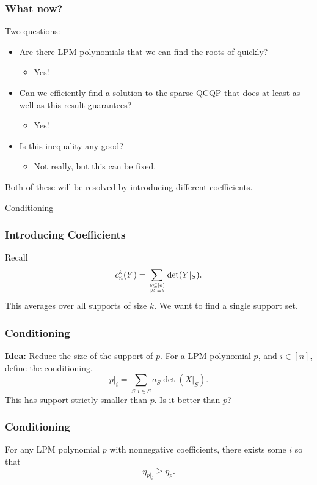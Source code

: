 \documentclass{beamer}
\renewcommand\top[2]{\genfrac{}{}{0pt}{}{#1}{#2}}
\begin{document}
\begin{frame}
    \frametitle{What now?}
    Two questions:
    \begin{itemize}
        \item Are there LPM polynomials that we can find the roots of quickly?
            \begin{itemize}
                \item Yes!
            \end{itemize}
        \item Can we efficiently find a solution to the sparse QCQP that does at least as well as this result guarantees?
            \begin{itemize}
                \item Yes!
            \end{itemize}
        \item Is this inequality any good?
            \begin{itemize}
                \item Not really, but this can be fixed.
            \end{itemize}
    \end{itemize}
    \pause
    Both of these will be resolved by introducing different coefficients.
\end{frame}
\begin{frame}
    \centering
    \huge
    {\color{gray}Conditioning}
\end{frame}
\begin{frame}
    \frametitle{Introducing Coefficients}
    Recall
    \[
        c_n^k(Y) = \sum_{\top{S \subseteq [n]}{|S| = k}}  \det(Y|_S).
    \]
    \pause 
    This averages over all supports of size $k$. We want to find a single support set.
\end{frame}
\begin{frame}
    \frametitle{Conditioning}
    \textbf{Idea:} Reduce the size of the support of $p$.
    For a LPM polynomial $p$, and $i \in [n]$, define the conditioning.
    \[
        p|_i = \sum_{S : i \in S} a_S \det(X|_S).
    \]
    This has support strictly smaller than $p$. Is it better than $p$?
\end{frame}
\begin{frame}
    \frametitle{Conditioning}
    \begin{theorem}
    For any LPM polynomial $p$ with nonnegative coefficients, there exists some $i$ so that
    \[
        \eta_{p|_i} \ge \eta_{p}.
    \]
    \end{theorem}
\end{frame}
\end{document}

